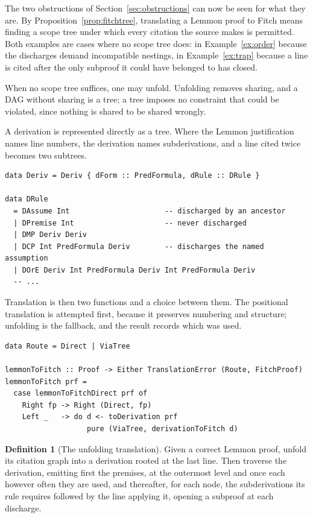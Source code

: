 \documentclass[11pt]{article}
\theoremstyle{plain}
\theoremstyle{definition}
\newtheorem{definition}[theorem]{Definition}
\theoremstyle{remark}
\begin{document}
The two obstructions of Section~\ref{sec:obstructions} can now be seen for
what they are. By Proposition~\ref{prop:fitchtree}, translating a Lemmon proof
to Fitch means finding a scope tree under which every citation the source
makes is permitted. Both examples are
cases where no scope tree does: in Example~\ref{ex:order} because the
discharges demand incompatible nestings, in Example~\ref{ex:trap} because a
line is cited after the only subproof it could have belonged to has closed.

When no scope tree suffices, one may unfold. Unfolding removes sharing, and a
DAG without sharing is a tree; a tree imposes no constraint that could be
violated, since nothing is shared to be shared wrongly.

A derivation is represented directly as a tree. Where the Lemmon
justification names line numbers, the derivation names subderivations, and a
line cited twice becomes two subtrees.

\begin{lstlisting}
data Deriv = Deriv { dForm :: PredFormula, dRule :: DRule }

data DRule
  = DAssume Int                      -- discharged by an ancestor
  | DPremise Int                     -- never discharged
  | DMP Deriv Deriv
  | DCP Int PredFormula Deriv        -- discharges the named assumption
  | DOrE Deriv Int PredFormula Deriv Int PredFormula Deriv
  -- ...
\end{lstlisting}

Translation is then two functions and a choice between them. The positional
translation is attempted first, because it preserves numbering and structure;
unfolding is the fallback, and the result records which was used.

\begin{lstlisting}
data Route = Direct | ViaTree

lemmonToFitch :: Proof -> Either TranslationError (Route, FitchProof)
lemmonToFitch prf =
  case lemmonToFitchDirect prf of
    Right fp -> Right (Direct, fp)
    Left _   -> do d <- toDerivation prf
                   pure (ViaTree, derivationToFitch d)
\end{lstlisting}

\begin{definition}[The unfolding translation]\label{def:construction}
Given a correct Lemmon proof, unfold its citation graph into a derivation
rooted at the last line. Then traverse the derivation, emitting first the
premises, at the outermost level and once each however often they are used,
and thereafter, for each node, the subderivations its rule requires followed
by the line applying it, opening a subproof at each discharge.
\end{definition}
\end{document}
